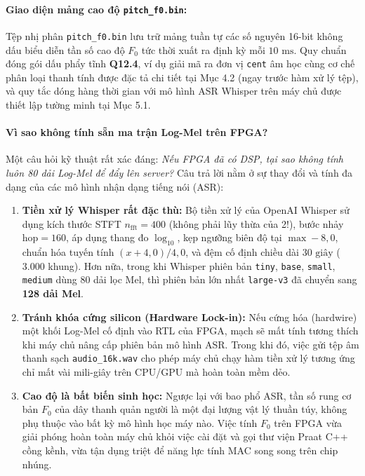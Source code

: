 \documentclass[11pt,a4paper]{article}
\begin{document}
\paragraph{Giao diện mảng cao độ \texttt{pitch\_f0.bin}:}
Tệp nhị phân \texttt{pitch\_f0.bin} lưu trữ mảng tuần tự các số nguyên 16-bit không dấu biểu diễn tần số cao độ $F_0$ tức thời xuất ra định kỳ mỗi $10\text{ ms}$. Quy chuẩn đóng gói dấu phẩy tĩnh \textbf{Q12.4}, ví dụ giải mã ra đơn vị \texttt{cent} âm học cùng cơ chế phân loại thanh tính được đặc tả chi tiết tại Mục 4.2 (ngay trước hàm xử lý tệp), và quy tắc dóng hàng thời gian với mô hình ASR Whisper trên máy chủ được thiết lập tường minh tại Mục 5.1.

\paragraph{Vì sao không tính sẵn ma trận Log-Mel trên FPGA?}
Một câu hỏi kỹ thuật rất xác đáng: \textit{Nếu FPGA đã có DSP, tại sao không tính luôn 80 dải Log-Mel để đẩy lên server?} Câu trả lời nằm ở sự thay đổi và tính đa dạng của các mô hình nhận dạng tiếng nói (ASR):
\begin{enumerate}
    \setlength{\itemsep}{0.5pt}
    \item \textbf{Tiền xử lý Whisper rất đặc thù:} Bộ tiền xử lý của OpenAI Whisper sử dụng kích thước STFT $n_{\text{fft}} = 400$ (không phải lũy thừa của 2!), bước nhảy $\text{hop} = 160$, áp dụng thang đo $\log_{10}$, kẹp ngưỡng biên độ tại $\max - 8{,}0$, chuẩn hóa tuyến tính $(x + 4{,}0) / 4{,}0$, và đệm cố định chiều dài $30\text{ giây}$ ($3.000$ khung). Hơn nữa, trong khi Whisper phiên bản \texttt{tiny}, \texttt{base}, \texttt{small}, \texttt{medium} dùng 80 dải lọc Mel, thì phiên bản lớn nhất \texttt{large-v3} đã chuyển sang \textbf{128 dải Mel}.
    \item \textbf{Tránh khóa cứng silicon (Hardware Lock-in):} Nếu cứng hóa (hardwire) một khối Log-Mel cố định vào RTL của FPGA, mạch sẽ mất tính tương thích khi máy chủ nâng cấp phiên bản mô hình ASR. Trong khi đó, việc gửi tệp âm thanh sạch \texttt{audio\_16k.wav} cho phép máy chủ chạy hàm tiền xử lý tương ứng chỉ mất vài mili-giây trên CPU/GPU mà hoàn toàn mềm dẻo.
    \item \textbf{Cao độ là bất biến sinh học:} Ngược lại với bao phổ ASR, tần số rung cơ bản $F_0$ của dây thanh quản người là một đại lượng vật lý thuần túy, không phụ thuộc vào bất kỳ mô hình học máy nào. Việc tính $F_0$ trên FPGA vừa giải phóng hoàn toàn máy chủ khỏi việc cài đặt và gọi thư viện Praat C++ cồng kềnh, vừa tận dụng triệt để năng lực tính MAC song song trên chip nhúng.
\end{enumerate}
\end{document}
